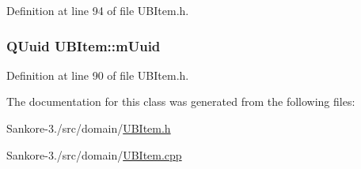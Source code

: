 Definition at line 94 of file U\-B\-Item.\-h.

\hypertarget{class_u_b_item_a4cb5aeff8000c84de48bf0a2ab6376ef}{
\subsubsection[{m\-Uuid}]{\setlength{\rightskip}{0pt plus 5cm}Q\-Uuid U\-B\-Item\-::m\-Uuid\hspace{0.3cm}{\ttfamily [protected]}}}\label{d8/d1e/class_u_b_item_a4cb5aeff8000c84de48bf0a2ab6376ef}


Definition at line 90 of file U\-B\-Item.\-h.



The documentation for this class was generated from the following files\-:\begin{DoxyCompactItemize}
\item 
Sankore-\/3./src/domain/\hyperlink{_u_b_item_8h}{U\-B\-Item.\-h}\item 
Sankore-\/3./src/domain/\hyperlink{_u_b_item_8cpp}{U\-B\-Item.\-cpp}\end{DoxyCompactItemize}
